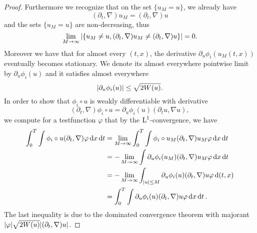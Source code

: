 \begin{proof}
	Furthermore we recognize that on the set $ \{ u_{M } = u \} $, we already have
	\begin{equation*}
		( \partial_{ t } , \nabla ) u_{ M }
		=
		( \partial_{ t } , \nabla ) u
	\end{equation*}
	and the sets $ \{ u_{ M } = u \} $ are non-decreasing, thus
	\begin{equation*}
		\lim_{ M \to \infty }
		\abs{
			\left\{
				u_{ M } \neq u, ( \partial_{ t } , \nabla ) u_{ M } \neq ( \partial_{ t }, \nabla ) u 
			\right\}
		}
		=
		0.
	\end{equation*}
	Moreover we have that for almost every $ ( t, x ) $, the derivative $ \partial_{ u } \phi_{ i } ( u_{ M } ( t , x ) ) $ eventually becomes stationary. We denote its almost everywhere pointwise limit by $ \partial_{ u } \phi_{ i } ( u ) $ and it satisfies almost everywhere
	\begin{equation*}
		\abs{
			\partial_{ u } \phi_{ i } ( u ) 
		}
		\leq
		\sqrt{ 2 W ( u ) }.
	\end{equation*}
	In order to show that $ \phi_{ i } \circ u $ is weakly differentiable with derivative 
	\begin{equation*}
		( \partial_{ t } , \nabla ) \phi_{ i } \circ u
		=
		\partial_{ u } \phi_{ i } ( u ) ( \partial_{ t } u, \nabla u ),
	\end{equation*}
	we compute for a testfunction $ \varphi $ that by the $ \operatorname{L}^{ 1 } $-convergence, we have
	\begin{align*}
		\int_{ 0 }^{ T }
		\int
			\phi_{ i } \circ u
			( \partial_{ t } , \nabla ) \varphi
		\dd{ x}
		\dd{ t }
		&
		=
		\lim_{ M \to \infty }
			\int_{0 }^{ T }
				\int
					\phi_{ i } \circ u_{ M }
					( \partial_{ t } , \nabla ) u_{ M }
					\varphi
				\dd{ x }
			\dd{ t }
		\\
		& =
		- \lim_{ M \to \infty }
			\int
				\partial_{ u } \phi_{ i } ( u_{ M } )
				( \partial_{ t } , \nabla ) u_{ M }
				\varphi
			\dd{ x }
		\dd{ t }
		\\
		& =
		- \lim_{ M \to \infty }
			\int_{ \abs{ u } \leq M }
				\partial_{ u } \phi_{ i } ( u ) 
				( \partial_{ t } , \nabla ) u
				\varphi
			\dd{ ( t, x ) }
		\\
		& =
		\int_{ 0 }^{ T }
			\int
				\partial_{ u } \phi_{ i } ( u ) 
				( \partial_{ t } , \nabla ) u
				\varphi
			\dd{ x }
		\dd{ t }.
	\end{align*}
	The last inequality is due to the dominated convergence theorem with majorant $ \abs{ \varphi } \sqrt{ 2 W ( u ) } \abs{ ( \partial_{ t } , \nabla ) u } $.

\end{proof}

